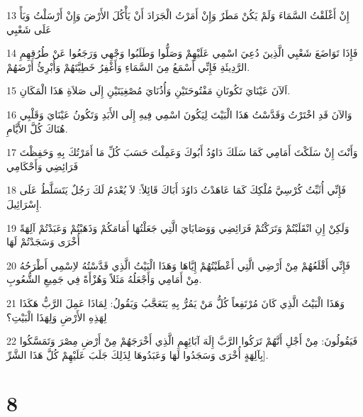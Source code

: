 \par 13 إِنْ أَغْلَقْتُ السَّمَاءَ وَلَمْ يَكُنْ مَطَرٌ وَإِنْ أَمَرْتُ الْجَرَادَ أَنْ يَأْكُلَ الأَرْضَ وَإِنْ أَرْسَلْتُ وَبَأً عَلَى شَعْبِي
\par 14 فَإِذَا تَوَاضَعَ شَعْبِي الَّذِينَ دُعِيَ اسْمِي عَلَيْهِمْ وَصَلُّوا وَطَلَبُوا وَجْهِي وَرَجَعُوا عَنْ طُرُقِهِمِ الرَّدِيئَةِ فَإِنِّي أَسْمَعُ مِنَ السَّمَاءِ وَأَغْفِرُ خَطِيَّتَهُمْ وَأُبْرِئُ أَرْضَهُمْ.
\par 15 اَلآنَ عَيْنَايَ تَكُونَانِ مَفْتُوحَتَيْنِ وَأُذُنَايَ مُصْغِيَتَيْنِ إِلَى صَلاَةِ هَذَا الْمَكَانِ.
\par 16 وَالآنَ قَدِ اخْتَرْتُ وَقَدَّسْتُ هَذَا الْبَيْتَ لِيَكُونَ اسْمِي فِيهِ إِلَى الأَبَدِ وَتَكُونُ عَيْنَايَ وَقَلْبِي هُنَاكَ كُلَّ الأَيَّامِ.
\par 17 وَأَنْتَ إِنْ سَلَكْتَ أَمَامِي كَمَا سَلَكَ دَاوُدُ أَبُوكَ وَعَمِلْتَ حَسَبَ كُلِّ مَا أَمَرْتُكَ بِهِ وَحَفِظْتَ فَرَائِضِي وَأَحْكَامِي
\par 18 فَإِنِّي أُثَبِّتُ كُرْسِيَّ مُلْكِكَ كَمَا عَاهَدْتُ دَاوُدَ أَبَاكَ قَائِلاً: لاَ يُعْدَمُ لَكَ رَجُلٌ يَتَسَلَّطُ عَلَى إِسْرَائِيلَ.
\par 19 وَلَكِنْ إِنِ انْقَلَبْتُمْ وَتَرَكْتُمْ فَرَائِضِي وَوَصَايَايَ الَّتِي جَعَلْتُهَا أَمَامَكُمْ وَذَهَبْتُمْ وَعَبَدْتُمْ آلِهَةً أُخْرَى وَسَجَدْتُمْ لَهَا
\par 20 فَإِنِّي أَقْلَعُهُمْ مِنْ أَرْضِي الَّتِي أَعْطَيْتُهُمْ إِيَّاهَا وَهَذَا الْبَيْتُ الَّذِي قَدَّسْتُهُ لاِسْمِي أَطْرَحُهُ مِنْ أَمَامِي وَأَجْعَلُهُ مَثَلاً وَهُزْأَةً فِي جَمِيعِ الشُّعُوبِ.
\par 21 وَهَذَا الْبَيْتُ الَّذِي كَانَ مُرْتَفِعاً كُلُّ مَنْ يَمُرُّ بِهِ يَتَعَجَّبُ وَيَقُولُ: لِمَاذَا عَمِلَ الرَّبُّ هَكَذَا لِهَذِهِ الأَرْضِ وَلِهَذَا الْبَيْتِ؟
\par 22 فَيَقُولُونَ: مِنْ أَجْلِ أَنَّهُمْ تَرَكُوا الرَّبَّ إِلَهَ آبَائِهِمِ الَّذِي أَخْرَجَهُمْ مِنْ أَرْضِ مِصْرَ وَتَمَسَّكُوا بِآلِهَةٍ أُخْرَى وَسَجَدُوا لَهَا وَعَبَدُوهَا لِذَلِكَ جَلَبَ عَلَيْهِمْ كُلَّ هَذَا الشَّرِّ].

\chapter{8}


